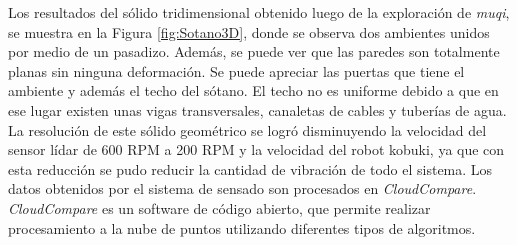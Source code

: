 
Los resultados del sólido tridimensional obtenido luego de la exploración de 
\textit{muqi}, se muestra en la Figura \ref{fig:Sotano3D}, donde se observa dos 
ambientes unidos por medio de un pasadizo. Además, se puede ver que las paredes 
son totalmente planas sin ninguna deformación. Se puede apreciar las puertas que 
tiene el ambiente y además el techo del sótano. El techo no es uniforme debido 
a que en ese lugar existen unas vigas transversales, canaletas de cables y 
tuberías de agua. La resolución de este sólido geométrico se logró disminuyendo 
la velocidad del sensor lídar de 600 RPM a 200 RPM y la velocidad del robot 
kobuki, ya que con esta reducción se pudo reducir la cantidad de vibración 
de todo el sistema. Los datos obtenidos por el sistema de sensado son 
procesados en \textit{CloudCompare}. \textit{CloudCompare} es un software de 
código abierto, que permite realizar procesamiento a la nube de puntos 
utilizando diferentes tipos de algoritmos.

